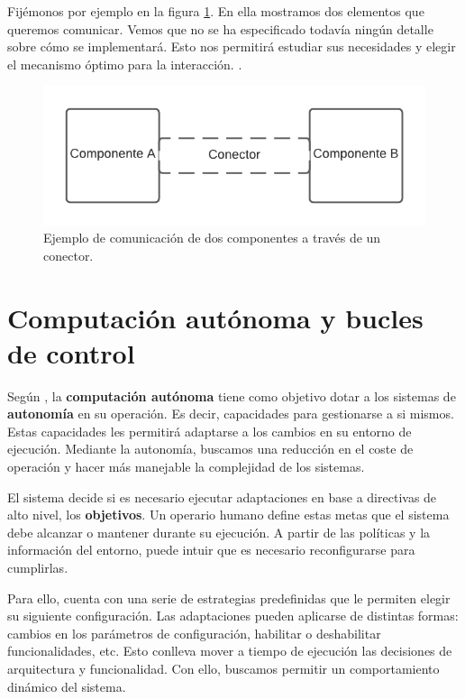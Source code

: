 Fijémonos por ejemplo en la figura \ref{fig:componentesYConectorEjemplo}. En ella mostramos dos elementos que queremos comunicar. Vemos que no se ha especificado todavía ningún detalle sobre cómo se implementará. Esto nos permitirá estudiar sus necesidades y elegir el mecanismo óptimo para la interacción. \cite{taylorSoftwareArchitectureFoundations2009}.

\begin{figure}[h!]
  \centering
  \includegraphics[scale=0.78]{cap_contexto_tecnologico/images/conector}
  \caption{Ejemplo de comunicación de dos componentes a través de un conector.}
  \label{fig:componentesYConectorEjemplo}
\end{figure}

\section{Computación autónoma y bucles de control}

Según \cite{ibmcorporationArchitecturalBlueprintAutonomic2006}, la \textbf{computación autónoma} tiene como objetivo dotar a los sistemas de \textbf{autonomía} en su operación. Es decir, capacidades para gestionarse a si mismos. Estas capacidades les permitirá adaptarse a los cambios en su entorno de ejecución. Mediante la autonomía, buscamos una reducción en el coste de operación y hacer más manejable la complejidad de los sistemas.

El sistema decide si es necesario ejecutar adaptaciones en base a directivas de alto nivel, los \textbf{objetivos}. Un operario humano define estas metas que el sistema debe alcanzar o mantener durante su ejecución. A partir de las políticas y la información del entorno, puede intuir que es necesario reconfigurarse para cumplirlas.

Para ello, cuenta con una serie de estrategias predefinidas que le permiten elegir su siguiente configuración. \cite{garlanIncreasingSystemDependability2003} Las adaptaciones pueden aplicarse de distintas formas: cambios en los parámetros de configuración, habilitar o deshabilitar funcionalidades, etc. Esto conlleva mover a tiempo de ejecución las decisiones de arquitectura y funcionalidad. Con ello, buscamos permitir un comportamiento dinámico del sistema. \cite{brunEngineeringSelfAdaptiveSystems2009}

